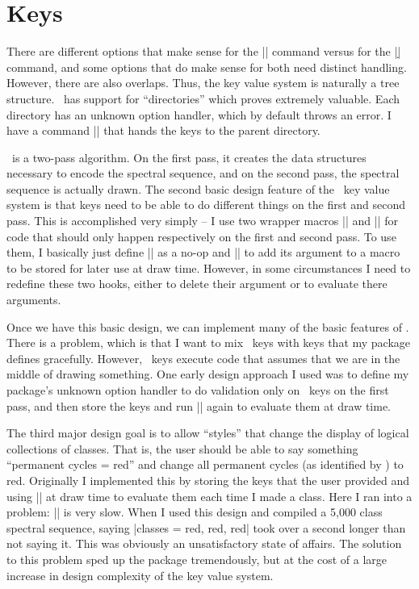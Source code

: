 \section{Keys}
There are different options that make sense for the |\class| command versus for the |\d| command, and some options that do make sense for both need distinct handling. However, there are also overlaps. Thus, the key value system is naturally a tree structure. \pgfkeysname\ has support for ``directories'' which proves extremely valuable. Each directory has an unknown option handler, which by default throws an error. I have a command |\sseq@passoptionto| that hands the keys to the parent directory.

\sseqpages\ is a two-pass algorithm. On the first pass, it creates the data structures necessary to encode the spectral sequence, and on the second pass, the spectral sequence is actually drawn. The second basic design feature of the \sseqpages\ key value system is that keys need to be able to do different things on the first and second pass. This is accomplished very simply -- I use two wrapper macros |\sseq@options@firstpass| and |\sseq@options@secondpass| for code that should only happen respectively on the first and second pass. To use them, I basically just define |\sseq@options@firstpass| as a no-op and |\sseq@options@secondpass| to add its argument to a macro to be stored for later use at draw time. However, in some circumstances I need to redefine these two hooks, either to delete their argument or to evaluate there arguments.

Once we have this basic design, we can implement many of the basic features of \sseqpages. There is a problem, which is that I want to mix \tikzname\ keys with keys that my package defines gracefully. However, \tikzname\ keys execute code that assumes that we are in the middle of drawing something. One early design approach I used was to define my package's unknown option handler to do validation only on \tikzname\ keys on the first pass, and then store the keys and run |\pgfkeys| again to evaluate them at draw time.

The third major design goal is to allow ``styles'' that change the display of logical collections of classes. That is, the user should be able to say something ``permanent cycles = red'' and change all permanent cycles (as identified by \spectralsequences) to red. Originally I implemented this by storing the keys that the user provided and using |\pgfkeys| at draw time to evaluate them each time I made a class. Here I ran into a problem: |\pgfkeys| is very slow. When I used this design and compiled a 5,000 class spectral sequence, saying \codeverb|classes = {red, red, red}| took over a second longer than not saying it. This was obviously an unsatisfactory state of affairs. The solution to this problem sped up the package tremendously, but at the cost of a large increase in design complexity of the key value system.

